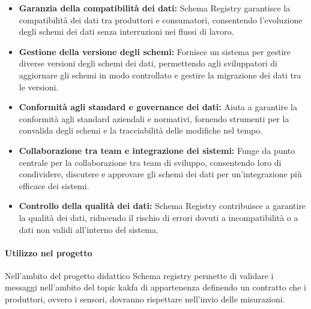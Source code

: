 \begin{itemize}
\item \textbf{Garanzia della compatibilità dei dati:} Schema Registry garantisce la compatibilità dei dati tra produttori e consumatori, consentendo l'evoluzione degli schemi dei dati senza interruzioni nei flussi di lavoro.

\item \textbf{Gestione della versione degli schemi:} Fornisce un sistema per gestire diverse versioni degli schemi dei dati, permettendo agli sviluppatori di aggiornare gli schemi in modo controllato e gestire la migrazione dei dati tra le versioni.

\item \textbf{Conformità agli standard e governance dei dati:} Aiuta a garantire la conformità agli standard aziendali e normativi, fornendo strumenti per la convalida degli schemi e la tracciabilità delle modifiche nel tempo.

\item \textbf{Collaborazione tra team e integrazione dei sistemi:} Funge da punto centrale per la collaborazione tra team di sviluppo, consentendo loro di condividere, discutere e approvare gli schemi dei dati per un'integrazione più efficace dei sistemi.

\item \textbf{Controllo della qualità dei dati:} Schema Registry contribuisce a garantire la qualità dei dati, riducendo il rischio di errori dovuti a incompatibilità o a dati non validi all'interno del sistema.
\end{itemize}


\paragraph{Utilizzo nel progetto}
Nell'ambito del progetto didattico Schema registry permette di validare i messaggi nell'ambito del topic kakfa di appartenenza definendo un contratto che i produttori, ovvero i sensori, dovranno rispettare nell'invio delle misurazioni.